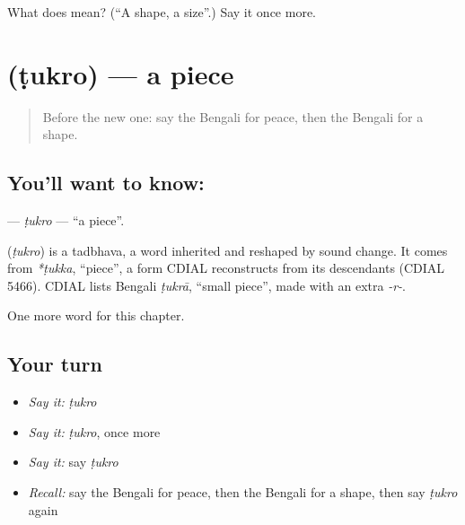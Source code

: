 \begin{tcolorbox}[breakable,colback=teal!4,colframe=teal!35!black,title={Before you move on}]
What does  mean? (\textquotedblleft{}A shape, a size\textquotedblright{}.) Say it once more.
\end{tcolorbox}
\section[\texorpdfstring{\bn{টুকরো} (ṭukro)}{টুকরো (ṭukro)}]{ (ṭukro) — a piece}

\label{lesson:BN-C170-tukro}



\begin{quote}
Before the new one: say the Bengali for peace, then the Bengali for a shape.
\end{quote}

\subsection*{You'll want to know: }
\textbf{} — \emph{ṭukro} — \textquotedblleft{}a piece\textquotedblright{}.

\begin{cousinweb}
\textbf{} (\emph{ṭukro}) is a tadbhava, a word inherited and reshaped by sound change. It comes from \emph{*ṭukka}, \textquotedblleft{}piece\textquotedblright{}, a form CDIAL reconstructs from its descendants (CDIAL 5466). CDIAL lists Bengali \emph{ṭukrā}, \textquotedblleft{}small piece\textquotedblright{}, made with an extra \emph{-r-}.
\end{cousinweb}

\begin{grammarlens}[title={What you've built}]
One more word for this chapter.
\end{grammarlens}

\subsection*{Your turn}
\begin{itemize}
\raggedright
  \item \emph{Say it:} \emph{ṭukro}
  \item \emph{Say it:} \emph{ṭukro}, once more
  \item \emph{Say it:} say \emph{ṭukro}
  \item \emph{Recall:} say the Bengali for peace, then the Bengali for a shape, then say \emph{ṭukro} again
\end{itemize}

